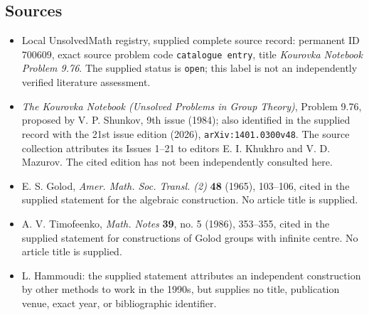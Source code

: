 \documentclass[11pt]{article}
\begin{document}
\subsection{Sources}
\begin{itemize}
\item Local UnsolvedMath registry, supplied complete source record: permanent ID \(700609\), exact source problem code \texttt{catalogue entry}, title \emph{Kourovka Notebook Problem 9.76}. The supplied status is \texttt{open}; this label is not an independently verified literature assessment.
\item \emph{The Kourovka Notebook (Unsolved Problems in Group Theory)}, Problem 9.76, proposed by V. P. Shunkov, 9th issue (1984); also identified in the supplied record with the 21st issue edition (2026), \texttt{arXiv:1401.0300v48}. The source collection attributes its Issues 1--21 to editors E. I. Khukhro and V. D. Mazurov. The cited edition has not been independently consulted here.
\item E. S. Golod, \emph{Amer. Math. Soc. Transl. (2)} \textbf{48} (1965), 103--106, cited in the supplied statement for the algebraic construction. No article title is supplied.
\item A. V. Timofeenko, \emph{Math. Notes} \textbf{39}, no. 5 (1986), 353--355, cited in the supplied statement for constructions of Golod groups with infinite centre. No article title is supplied.
\item L. Hammoudi: the supplied statement attributes an independent construction by other methods to work in the 1990s, but supplies no title, publication venue, exact year, or bibliographic identifier.
\end{itemize}
\end{document}
